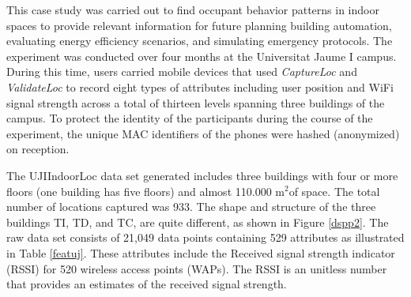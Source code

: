 




This case study was carried out to find occupant  behavior patterns  in  indoor  spaces  to provide  relevant  information  for  future planning  building  automation, evaluating energy efficiency scenarios, and simulating   emergency   protocols. The experiment was conducted over four months at the Universitat Jaume I campus. During this time, users carried mobile devices that used \textit{CaptureLoc} and \textit{ValidateLoc} to record eight types of attributes including user position and WiFi signal strength across a total of thirteen levels spanning three buildings of the campus. To protect the identity of the participants during the course of the experiment, the unique MAC identifiers of the phones were hashed (anonymized) on reception.



The UJIIndoorLoc data set generated includes three buildings with four or more floors (one building has five floors) and almost 110.000 m$^{2}$of space. The total number of locations captured was 933. The shape and structure of the three buildings TI, TD, and TC, are quite different, as shown in Figure \ref{dspp2}. The raw data set consists of 21,049 data points containing 529 attributes as illustrated in Table \ref{featuj}. These attributes include the Received signal strength indicator (RSSI) for 520 wireless access points (WAPs). The RSSI is an unitless number that provides an estimates of the  received signal strength.


